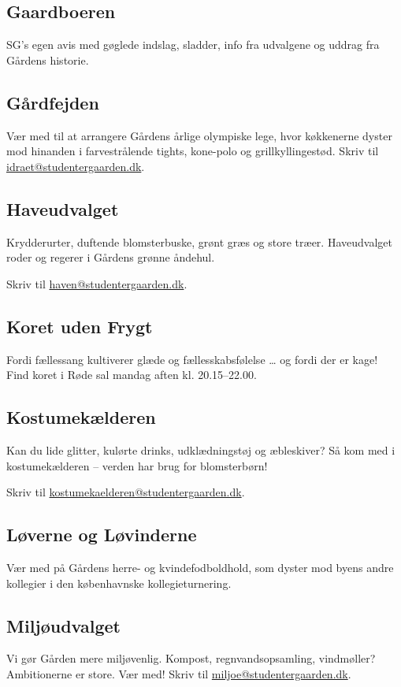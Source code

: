 \documentclass[11pt,article,twoside,openany,danish,extrafontsizes]{memoir} %
\begin{document}
\subsection{Gaardboeren}
SG's egen avis med gøglede indslag, sladder, info fra udvalgene og uddrag fra Gårdens historie. %

\subsection{Gårdfejden}
Vær med til at arrangere Gårdens årlige olympiske lege, hvor køkkenerne dyster mod hinanden i farvestrålende tights, kone-polo og grillkyllingestød. Skriv til \url{idraet@studentergaarden.dk}.



\subsection{Haveudvalget}
Krydderurter, duftende blomsterbuske, grønt græs og store træer. Haveudvalget roder og regerer i Gårdens grønne åndehul.

\noindent
Skriv til \url{haven@studentergaarden.dk}.



\subsection{Koret uden Frygt}
Fordi fællessang kultiverer glæde og fællesskabsfølelse \dots{} og fordi der er kage! Find koret i Røde sal mandag aften kl. 20.15--22.00.

\subsection{Kostumekælderen}
Kan du lide glitter, kulørte drinks, udklædningstøj og æbleskiver? Så kom med i kostumekælderen -- verden har brug for blomsterbørn!

\noindent
Skriv til \url{kostumekaelderen@studentergaarden.dk}.

\subsection{Løverne og Løvinderne}
Vær med på Gårdens herre- og kvindefodboldhold, som dyster mod byens andre kollegier i den københavnske kollegieturnering. %

\subsection{Miljøudvalget}
Vi gør Gården mere miljøvenlig. Kompost, regnvandsopsamling, vindmøller? Ambitionerne er store. Vær med! Skriv til \url{miljoe@studentergaarden.dk}.
\end{document}
